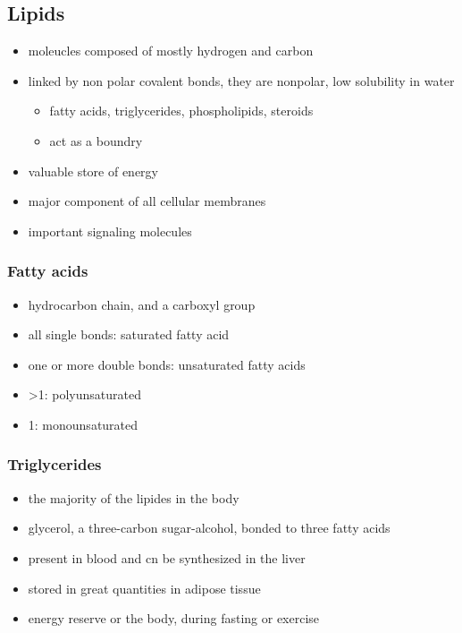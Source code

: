 \documentclass[11pt]{article}
\begin{document}
\subsection{Lipids}
\label{sec:org839607d}
\begin{itemize}
\item moleucles composed of mostly hydrogen and carbon
\item linked by non polar covalent bonds, they are nonpolar, low solubility in water
\begin{itemize}
\item fatty acids, triglycerides, phospholipids, steroids
\item act as a boundry
\end{itemize}
\item valuable store of energy
\item major component of all cellular membranes
\item important signaling molecules
\end{itemize}
\subsubsection{Fatty acids}
\label{sec:orgd384d04}
\begin{itemize}
\item hydrocarbon chain, and a carboxyl group
\item all single bonds: saturated fatty acid
\item one or more double bonds: unsaturated fatty acids
\item >1: polyunsaturated
\item 1: monounsaturated
\end{itemize}
\subsubsection{Triglycerides}
\label{sec:org405daca}
\begin{itemize}
\item the majority of the lipides in the body
\item glycerol, a three-carbon sugar-alcohol, bonded to three fatty acids
\item present in blood and cn be synthesized in the liver
\item stored in great quantities in adipose tissue
\item energy reserve or the body, during fasting or exercise
\end{itemize}
\end{document}
